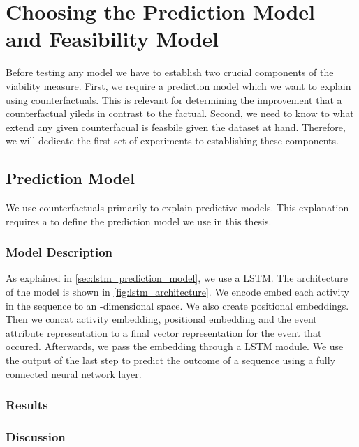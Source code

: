 \documentclass[./../../paper.tex]{subfiles}
\begin{document}
\section{Choosing the Prediction Model and Feasibility Model}
Before testing any model we have to establish two crucial components of the viability measure. First, we require a prediction model which we want to explain using counterfactuals. This is relevant for determining the improvement that a counterfactual yileds in contrast to the factual. Second, we need to know to what extend any given counterfacual is feasbile given the dataset at hand. Therefore, we will dedicate the first set of experiments to establishing these components.

\subsection{Prediction Model}
We use counterfactuals primarily to explain predictive models. This explanation requires a to define the prediction model we use in this thesis. 

\subsubsection{Model Description}
As explained in \autoref{sec:lstm_prediction_model}, we use a \gls{LSTM}. 
The architecture of the model is shown in \autoref{fig:lstm_architecture}. We encode embed each activity in the sequence to an -dimensional space. We also create positional embeddings. Then we concat activity embedding, positional embedding and the event attribute representation to a final vector representation for the event that occured. Afterwards, we pass the embedding through a \gls{LSTM} module. We use the output of the last step to predict the outcome of a sequence using a fully connected neural network layer.


\subsubsection{Results}

\subsubsection{Discussion}
\end{document}
